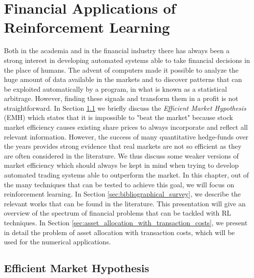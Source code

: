 \chapter{Financial Applications of Reinforcement Learning}
\label{ch:financial_applications_of_reinforcement_learning}

Both in the academia and in the financial industry there has always been a strong interest in developing automated systems able to take financial decisions in the place of humans. The advent of computers made it possible to analyze the huge amount of data available in the markets and to discover patterns that can be exploited automatically by a program, in what is known as a statistical arbitrage. However, finding these signals and transform them in a profit is not straightforward. In Section  \ref{sec:efficient_market_hypothesis} we briefly discuss the \emph{Efficient Market Hypothesis} (EMH) which states that it is impossible to "beat the market" because stock market efficiency causes existing share prices to always incorporate and reflect all relevant information. However, the success of many quantitative hedge-funds over the years provides strong evidence that real markets are not so efficient as they are often considered in the literature. We thus discuss some weaker versions of market efficiency which should always be kept in mind when trying to develop automated trading systems able to outperform the market. In this chapter, out of the many techniques that can be tested to achieve this goal, we will focus on reinforcement learning. In Section \ref{sec:bibliographical_survey}, we describe the relevant works that can be found in the literature. This presentation will give an overview of the spectrum of financial problems that can be tackled with RL techniques. In Section \ref{sec:asset_allocation_with_transaction_costs}, we present in detail the problem of asset allocation with transaction costs, which will be used for the numerical applications.

\section{Efficient Market Hypothesis}  
\label{sec:efficient_market_hypothesis}

